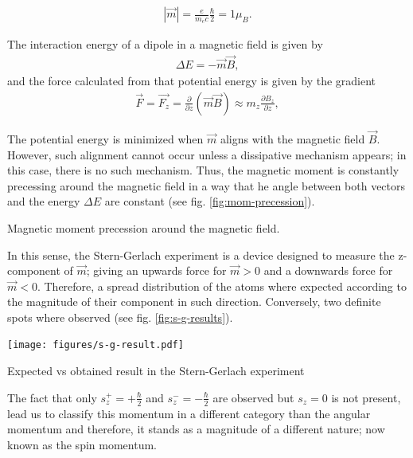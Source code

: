 \documentclass{article}
\begin{document}
\begin{align}\label{eq:magmom}
  \left|\vec{m}\right| = \frac{e}{m_ec}\frac{\hbar}{2} = 1\mu_B.
\end{align}

The interaction energy of a dipole in a magnetic field is given by
\begin{align}\label{eq:maginteraction}
  \Delta E = -\vec{m}\vec{B},
\end{align}
and the force calculated from that potential energy is given by the gradient
\begin{align}\label{eq:magforce}
  \vec{F} = \vec{F_z} = \frac{\partial}{\partial z}(\vec{m}\vec{B})\approx m_z\frac{\partial B_z}{\partial z},
\end{align}

The potential energy is minimized when $\vec{m}$ aligns with the magnetic field $\vec{B}$. However, such alignment cannot occur unless a dissipative mechanism appears; in this case, there is no such mechanism. Thus, the magnetic moment is constantly precessing around the magnetic field in a way that he angle between both vectors and the energy $\Delta E$ are constant (see fig. \ref{fig:mom-precession}).
\begin{marginfigure}%
  \begin{centering}
    \caption{Magnetic moment precession around the magnetic field.}\label{fig:mom-precession}
  \end{centering}
\end{marginfigure}
In this sense, the Stern-Gerlach experiment is a device designed to measure the z-component of $\vec{m}$; giving an upwards force for $\vec{m}>0$ and a downwards force for $\vec{m}<0$. Therefore, a spread distribution of the atoms where expected according to the magnitude of their component in such direction. Conversely, two definite spots where observed (see fig. \ref{fig:s-g-results}).
\begin{marginfigure}%
  \begin{centering}
  \texttt{[image: figures/s-g-result.pdf]}
  \caption{Expected vs obtained result in the Stern-Gerlach experiment}
  \label{fig:s-g-results}
  \end{centering}
\end{marginfigure}
The fact that only $s_z ^+=+\frac{\hbar}{2}$ and $s_z ^-=-\frac{\hbar}{2}$ are observed but $s_z=0$ is not present, lead us to classify this momentum in a different category than the angular momentum and therefore, it stands as a magnitude of a different nature; now known as the spin momentum.
\end{document}
